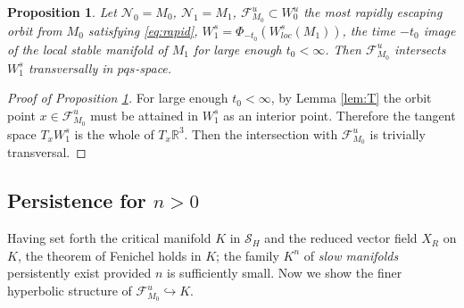 \documentclass[a4paper,11pt]{article}
\newtheorem{proposition}{Proposition}[section]
\theoremstyle{remark}
\begin{document}
\begin{proposition} \label{prop:singular}
 Let $\mathcal{N}_0=M_0$, $\mathcal{N}_1=M_1$, $\mathcal{F}^u_{M_0}\subset W^u_0$ the most rapidly escaping orbit from $M_0$ satisfying \eqref{eq:rapid}, $W^s_1=\Phi_{-t_0}(W^s_{loc}(M_1))$, the time $-t_0$ image of the local stable manifold of $M_1$ for large enough $t_0<\infty$. Then $\mathcal{F}^u_{M_0}$ intersects $W^s_1$ transversally in $pqs$-space.
\end{proposition}
\begin{proof}[Proof of Proposition \ref{prop:singular}]
%
For large enough $t_0<\infty$, by Lemma \ref{lem:T} the orbit point $x\in \mathcal{F}^u_{M_0}$ must be attained in $W^s_1$ as an interior point. Therefore the tangent space ${T}_x W^s_1$ is the whole of ${T}_x \mathbb{R}^3$. Then the intersection with $\mathcal{F}^u_{M_0}$ is trivially transversal.
\end{proof}

\subsection{Persistence for $n>0$} \label{sec:thmproof}
Having set forth the critical manifold $K$ in $\mathcal{S}_H$ and the reduced vector field $X_R$ on $K$, the theorem of Fenichel holds in $K$; the family $K^n$ of {\it slow manifolds} persistently exist provided $n$ is sufficiently small. Now we show the finer hyperbolic structure of $\mathcal{F}^u_{M_0} \hookrightarrow K$.
\end{document}
